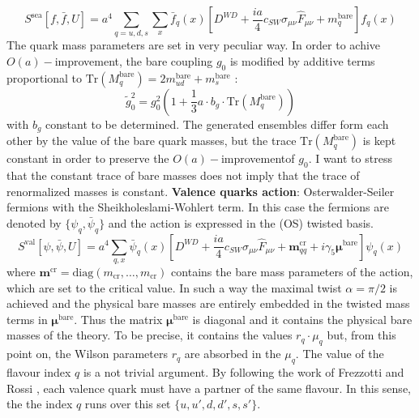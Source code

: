 \documentclass[english, LaM, oneside, noexaminfo]{sapthesis}
\newcommand{\bare}{^{\text{bare}}}
\newcommand{\oait}{$O(a)-$improvement}
\newcommand{\tr}{\text{Tr}}
\begin{document}
\begin{equation}\label{eq:sea-action}
    S^{\text{sea}}[f, \bar f, U] = a^4 \sum_{q=u,d,s} \sum_{x} \bar f_q (x) \left[ D^{WD} + \frac{ia}{4}c_{SW}\sigma_{\mu\nu}\hat F_{\mu\nu} + m_q\bare \right] f_q (x)
\end{equation}
The quark mass parameters are set in very peculiar way.
In order to achive \oait, the bare coupling $g_0$ is modified by additive terms proportional to $\tr (M_q\bare) = 2m_{ud}\bare + m_s\bare$ \cite{scale_CLS_opt1}:
\begin{equation*}
    \tilde{g}_0^2 = g_0^2 \left( 1+\frac{1}{3}a\cdot b_g \cdot \tr (M_q\bare) \right)
\end{equation*}
with $b_g$ constant to be determined.
The generated ensembles differ form each other by the value of the bare quark masses, but the trace $\tr (M_q\bare)$ is kept constant in order to preserve the \oait\space of $g_0$.
I want to stress that the constant trace of bare masses does not imply that the trace of renormalized masses is constant.
\newline\newline
{\bf Valence quarks action}: Osterwalder-Seiler fermions with the Sheikholeslami-Wohlert term.
In this case the fermions are denoted by $\{\psi_q, \bar\psi_q\}$ and the action is expressed in the (OS) twisted basis.
\begin{equation}\label{eq:valence-action}
    S^{\text{val}}[\psi, \bar\psi, U] = a^4 \sum_{q,x} \bar \psi_q (x) \left[ D^{WD} + \frac{ia}{4}c_{SW}\sigma_{\mu\nu}\hat F_{\mu\nu} + \boldsymbol{m}^\text{cr}_{qq} + i\gamma_5\boldsymbol{\mu}\bare \right] \psi_q (x)
\end{equation}
where $\boldsymbol{m}^\text{cr}=\text{diag} (m_\text{cr},\dots,m_\text{cr})$ contains the bare mass parameters of the action, which are set to the critical value.
In such a way the maximal twist $\alpha = \pi/2$ is achieved and the physical bare masses are entirely embedded in the twisted mass terms in $\boldsymbol{\mu}\bare$.
Thus the matrix $\boldsymbol{\mu}\bare$ is diagonal and it contains the physical bare masses of the theory.
To be precise, it contains the values $r_q\cdot \mu_q$ but, from this point on, the Wilson parameters $r_q$ are absorbed in the $\mu_q$.
\newline
The value of the flavour index $q$ is a not trivial argument.
By following the work of Frezzotti and Rossi \cite{FR2}, each valence quark must have a partner of the same flavour.
In this sense, the the index $q$ runs over this set $\{u,u',d,d',s,s'\}$.
\end{document}
